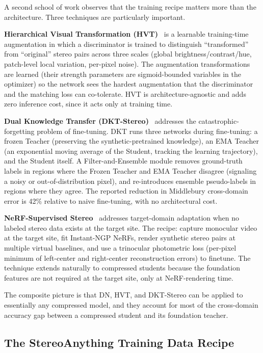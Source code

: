 A second school of work observes that the training recipe matters more than the architecture. Three techniques are particularly important.

\textbf{Hierarchical Visual Transformation (HVT)}~\cite{chang2023hvt} is a learnable training-time augmentation in which a discriminator is trained to distinguish ``transformed'' from ``original'' stereo pairs across three scales (global brightness/contrast/hue, patch-level local variation, per-pixel noise). The augmentation transformations are learned (their strength parameters are sigmoid-bounded variables in the optimizer) so the network sees the hardest augmentation that the discriminator and the matching loss can co-tolerate. HVT is architecture-agnostic and adds zero inference cost, since it acts only at training time.

\textbf{Dual Knowledge Transfer (DKT-Stereo)}~\cite{zhang2024dkt} addresses the catastrophic-forgetting problem of fine-tuning. DKT runs three networks during fine-tuning: a frozen Teacher (preserving the synthetic-pretrained knowledge), an EMA Teacher (an exponential moving average of the Student, tracking the learning trajectory), and the Student itself. A Filter-and-Ensemble module removes ground-truth labels in regions where the Frozen Teacher and EMA Teacher disagree (signaling a noisy or out-of-distribution pixel), and re-introduces ensemble pseudo-labels in regions where they agree. The reported reduction in Middlebury cross-domain error is 42\% relative to naive fine-tuning, with no architectural cost.

\textbf{NeRF-Supervised Stereo}~\cite{tosi2023nerfsupervised} addresses target-domain adaptation when no labeled stereo data exists at the target site. The recipe: capture monocular video at the target site, fit Instant-NGP NeRFs, render synthetic stereo pairs at multiple virtual baselines, and use a trinocular photometric loss (per-pixel minimum of left-center and right-center reconstruction errors) to finetune. The technique extends naturally to compressed students because the foundation features are not required at the target site, only at NeRF-rendering time.

The composite picture is that DN, HVT, and DKT-Stereo can be applied to essentially any compressed model, and they account for most of the cross-domain accuracy gap between a compressed student and its foundation teacher.

\subsection{The StereoAnything Training Data Recipe}

